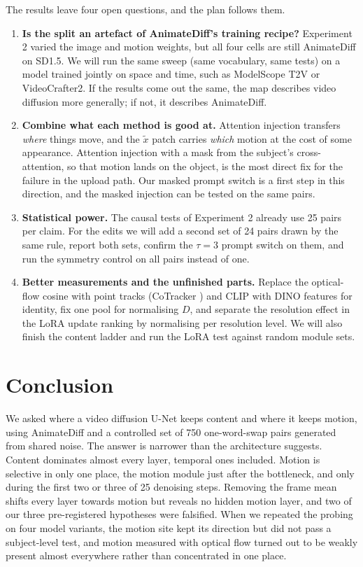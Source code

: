 \documentclass[twoside,english]{article}
\newcommand{\xd}{\tilde{x}}       %
\begin{document}
The results leave four open questions, and the plan follows them.
\begin{enumerate}
\item \textbf{Is the split an artefact of AnimateDiff's training recipe?} Experiment 2 varied the image
  and motion weights, but all four cells are still AnimateDiff on SD1.5. We will run the same sweep (same
  vocabulary, same tests) on a model trained jointly on space and time, such as ModelScope T2V or
  VideoCrafter2. If the results come out the same, the map describes video diffusion more generally; if
  not, it describes AnimateDiff.
\item \textbf{Combine what each method is good at.} Attention injection transfers \emph{where} things move,
  and the $\xd$ patch carries \emph{which} motion at the cost of some appearance. Attention injection with a
  mask from the subject's cross-attention, so that motion lands on the object, is the most direct fix for
  the failure in the upload path. Our masked prompt switch is a first step in this direction, and the
  masked injection can be tested on the same pairs.
\item \textbf{Statistical power.} The causal tests of Experiment 2 already use 25 pairs per claim. For the
  edits we will add a second set of 24 pairs drawn by the same rule, report both sets, confirm the
  $\tau = 3$ prompt switch on them, and run the symmetry control on all pairs instead of one.
\item \textbf{Better measurements and the unfinished parts.} Replace the optical-flow cosine with point
  tracks (CoTracker \citep{karaev2024cotracker}) and CLIP with DINO features for identity, fix one pool for
  normalising $D$, and separate the resolution effect in the LoRA update ranking by normalising per
  resolution level. We will also finish the content ladder and run the LoRA test against random module sets.
\end{enumerate}

\section{Conclusion} \label{sec:conclusion}

We asked where a video diffusion U-Net keeps content and where it keeps motion, using AnimateDiff and a
controlled set of 750 one-word-swap pairs generated from shared noise. The answer is narrower than the
architecture suggests. Content dominates almost every layer, temporal ones included. Motion is selective
in only one place, the motion module just after the bottleneck, and only during the first two or three of
25 denoising steps. Removing the frame mean shifts every layer towards motion but reveals no hidden motion
layer, and two of our three pre-registered hypotheses were falsified. When we repeated the probing on four
model variants, the motion site kept its direction but did not pass a subject-level test, and motion
measured with optical flow turned out to be weakly present almost everywhere rather than concentrated in
one place.
\end{document}
